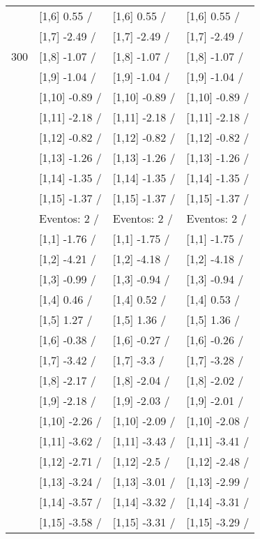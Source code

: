 \begin{table}
\begin{tabular}[t]{llll}
 & {}[1,6] 0.55  / & {}[1,6] 0.55  / & {}[1,6] 0.55  /\\
 & {}[1,7] -2.49  / & {}[1,7] -2.49  / & {}[1,7] -2.49  /\\
300 & {}[1,8] -1.07  / & {}[1,8] -1.07  / & {}[1,8] -1.07  /\\
\addlinespace
 & {}[1,9] -1.04  / & {}[1,9] -1.04  / & {}[1,9] -1.04  /\\
 & {}[1,10] -0.89  / & {}[1,10] -0.89  / & {}[1,10] -0.89  /\\
 & {}[1,11] -2.18  / & {}[1,11] -2.18  / & {}[1,11] -2.18  /\\
 & {}[1,12] -0.82  / & {}[1,12] -0.82  / & {}[1,12] -0.82  /\\
 & {}[1,13] -1.26  / & {}[1,13] -1.26  / & {}[1,13] -1.26  /\\
\addlinespace
 & {}[1,14] -1.35  / & {}[1,14] -1.35  / & {}[1,14] -1.35  /\\
 & {}[1,15] -1.37  / & {}[1,15] -1.37  / & {}[1,15] -1.37  /\\
 & Eventos:  2 / & Eventos:  2 / & Eventos:  2 /\\
 & {}[1,1] -1.76  / & {}[1,1] -1.75  / & {}[1,1] -1.75  /\\
 & {}[1,2] -4.21  / & {}[1,2] -4.18  / & {}[1,2] -4.18  /\\
\addlinespace
 & {}[1,3] -0.99  / & {}[1,3] -0.94  / & {}[1,3] -0.94  /\\
 & {}[1,4] 0.46  / & {}[1,4] 0.52  / & {}[1,4] 0.53  /\\
 & {}[1,5] 1.27  / & {}[1,5] 1.36  / & {}[1,5] 1.36  /\\
 & {}[1,6] -0.38  / & {}[1,6] -0.27  / & {}[1,6] -0.26  /\\
 & {}[1,7] -3.42  / & {}[1,7] -3.3  / & {}[1,7] -3.28  /\\
\addlinespace
500 & {}[1,8] -2.17  / & {}[1,8] -2.04  / & {}[1,8] -2.02  /\\
 & {}[1,9] -2.18  / & {}[1,9] -2.03  / & {}[1,9] -2.01  /\\
 & {}[1,10] -2.26  / & {}[1,10] -2.09  / & {}[1,10] -2.08  /\\
 & {}[1,11] -3.62  / & {}[1,11] -3.43  / & {}[1,11] -3.41  /\\
 & {}[1,12] -2.71  / & {}[1,12] -2.5  / & {}[1,12] -2.48  /\\
\addlinespace
 & {}[1,13] -3.24  / & {}[1,13] -3.01  / & {}[1,13] -2.99  /\\
 & {}[1,14] -3.57  / & {}[1,14] -3.32  / & {}[1,14] -3.31  /\\
 & {}[1,15] -3.58  / & {}[1,15] -3.31  / & {}[1,15] -3.29  /\\
\bottomrule
\end{tabular}
\end{table}
